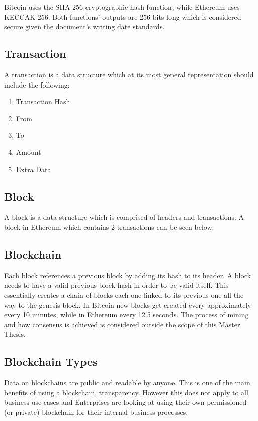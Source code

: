 Bitcoin uses the SHA-256 cryptographic hash function, while Ethereum uses KECCAK-256. Both functions' outputs are 256 bits long which is considered secure given the document's writing date standards.

\subsection{Transaction}
A transaction is a data structure which at its most general representation should include the following:
\begin{enumerate}
    \item Transaction Hash
    \item From
    \item To
    \item Amount
    \item Extra Data
\end{enumerate}

\subsection{Block}
A block is a data structure which is comprised of headers and transactions. A block in Ethereum which contains 2 transactions can be seen below:

\subsection{Blockchain}
Each block references a previous block by adding its hash to its header. A block needs to have a valid previous block hash in order to be valid itself. This essentially creates a chain of blocks each one linked to its previous one all the way to the genesis block. 
In Bitcoin new blocks get created every approximately every 10 minutes, while in Ethereum every 12.5 seconds. The process of mining and how consensus is achieved is considered outside the scope of this Master Thesis.

\subsection{Blockchain Types}
Data on blockchains are public and readable by anyone. This is one of the main benefits of using a blockchain, transparency. However this does not apply to all business use-cases and Enterprises are looking at using their own permissioned (or private) blockchain for their internal business processes.

